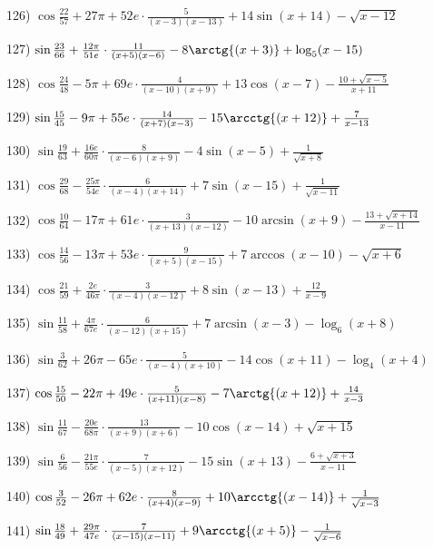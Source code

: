 \documentclass[11pt,ukrainian]{article}
\begin{document}
\smallskip\par
126) \space 
{ ${\cos\frac{22}{57}} + 27{\pi} + 52 e\cdot {\frac{5}{(x - 3)(x - 13)}} + {14\sin{(x + 14)}} - {\sqrt{x - 12}}$}
\smallskip\par
127) \space 
{ ${\sin\frac{23}{66}} + \frac{12{\pi}}{51 e}\cdot {\frac{11}{(x + 5)(x - 6)}} - {8\arctg{(x + 3)}} + {\log_{5}(x - 15)}$}
\smallskip\par
128) \space 
{ ${\cos\frac{24}{48}} - 5{\pi} + 69 e\cdot {\frac{4}{(x - 10)(x + 9)}} + {13\cos{(x - 7)}} - {\frac{10 + \sqrt{x - 5}}{x + 11}}$}
\smallskip\par
129) \space 
{ ${\sin\frac{15}{45}} - 9{\pi} + 55 e\cdot {\frac{14}{(x + 7)(x - 3)}} - {15\arcctg{(x + 12)}} + { \frac{7}{x - 13}}$}
\smallskip\par
130) \space 
{ ${\sin\frac{19}{63}} + \frac{16 e}{60{\pi}}\cdot {\frac{8}{(x - 6)(x + 9)}} - {4\sin{(x - 5)}} + {\frac{1}{\sqrt{x + 8}}}$}
\smallskip\par
131) \space 
{ ${\cos\frac{29}{68}} - \frac{25{\pi}}{54 e}\cdot {\frac{6}{(x - 4)(x + 14)}} + {7\sin{(x - 15)}} + {\frac{1}{\sqrt{x - 11}}}$}
\smallskip\par
132) \space 
{ ${\cos\frac{10}{64}} - 17{\pi} + 61 e\cdot {\frac{3}{(x + 13)(x - 12)}} - {10\arcsin{(x + 9)}} - {\frac{13 + \sqrt{x + 14}}{x - 11}}$}
\smallskip\par
133) \space 
{ ${\cos\frac{14}{56}} - 13{\pi} + 53 e\cdot {\frac{9}{(x + 5)(x - 15)}} + {7\arccos{(x - 10)}} - {\sqrt{x + 6}}$}
\smallskip\par
134) \space 
{ ${\cos\frac{21}{59}} + \frac{2 e}{46{\pi}}\cdot {\frac{3}{(x - 4)(x - 12)}} + {8\sin{(x - 13)}} + { \frac{12}{x - 9}}$}
\smallskip\par
135) \space 
{ ${\sin\frac{11}{58}} + \frac{4{\pi}}{67 e}\cdot {\frac{6}{(x - 12)(x + 15)}} + {7\arcsin{(x - 3)}} - {\log_{6}(x + 8)}$}
\smallskip\par
136) \space 
{ ${\sin\frac{3}{62}} + 26{\pi} - 65 e\cdot {\frac{5}{(x - 4)(x + 10)}} - {14\cos{(x + 11)}} - {\log_{4}(x + 4)}$}
\smallskip\par
137) \space 
{ ${\cos\frac{15}{50}} - 22{\pi} + 49 e\cdot {\frac{5}{(x + 11)(x - 8)}} - {7\arctg{(x + 12)}} + { \frac{14}{x - 3}}$}
\smallskip\par
138) \space 
{ ${\sin\frac{11}{67}} - \frac{20 e}{68{\pi}}\cdot {\frac{13}{(x + 9)(x + 6)}} - {10\cos{(x - 14)}} + {\sqrt{x + 15}}$}
\smallskip\par
139) \space 
{ ${\sin\frac{6}{56}} - \frac{21{\pi}}{55 e}\cdot {\frac{7}{(x - 5)(x + 12)}} - {15\sin{(x + 13)}} - {\frac{6 + \sqrt{x + 3}}{x - 11}}$}
\smallskip\par
140) \space 
{ ${\cos\frac{3}{52}} - 26{\pi} + 62 e\cdot {\frac{8}{(x + 4)(x - 9)}} + {10\arcctg{(x - 14)}} + {\frac{1}{\sqrt{x - 3}}}$}
\smallskip\par
141) \space 
{ ${\sin\frac{18}{49}} + \frac{29{\pi}}{47 e}\cdot {\frac{7}{(x - 15)(x - 11)}} + {9\arcctg{(x + 5)}} - {\frac{1}{\sqrt{x - 6}}}$}
\smallskip\par
\end{document}
